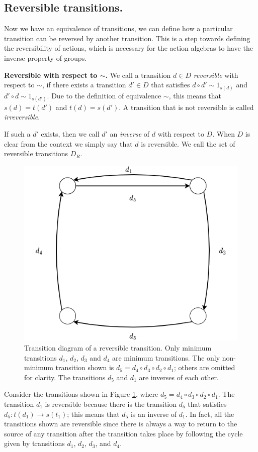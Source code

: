 \subsection{Reversible transitions.}

Now we have an equivalence of transitions, we can define how a particular transition can be reversed by another transition.
This is a step towards defining the reversibility of actions, which is necessary for the action algebras to have the inverse property of groups.


\textbf{Reversible with respect to $\sim$.}
We call a transition $d \in D$ \textit{reversible} with respect to $\sim$, if there exists a transition $d' \in D$ that satisfies  $d \circ d' \sim 1_{s(d)}$ and $d' \circ d \sim 1_{s(d')}$.
Due to the definition of equivalence $\sim$, this means that $s(d)=t(d')$ and $t(d)=s(d')$.
A transition that is not reversible is called \textit{irreversible}.

If such a $d'$ exists, then we call $d'$ an \textit{inverse} of $d$ with respect to $D$.
When $D$ is clear from the context we simply say that $d$ is reversible.
We call the set of reversible transitions $D_{R}$.

\begin{figure}
    \centering
    \includegraphics[width=0.5\linewidth]{ToUse/PaperDiscards/Images/reversible-composition.png}
    \caption{    
    Transition diagram of a reversible transition.
    Only minimum transitions $d_{1}$, $d_{2}$, $d_{3}$ and $d_{4}$ are minimum transitions.
    The only non-minimum transition shown is $d_{5} = d_{4} \circ d_{3} \circ d_{2} \circ d_{1}$; others are omitted for clarity.
    The transitions $d_{5}$ and $d_{1}$ are inverses of each other.
    }
    \label{fig:reversible-composition}
\end{figure}

Consider the transitions shown in Figure \ref{fig:reversible-composition}, where $d_{5} = d_{4} \circ d_{3} \circ d_{2} \circ d_{1}$.
The transition $d_{1}$ is reversible because there is the transition $d_{5}$ that satisfies $d_{5}: t(d_{1}) \xrightarrow{} s(t_{1})$; this means that $d_{5}$ is an inverse of $d_{1}$.
In fact, all the transitions shown are reversible since there is always a way to return to the source of any transition after the transition takes place by following the cycle given by transitions $d_{1}$, $d_{2}$, $d_{3}$, and $d_{4}$.

